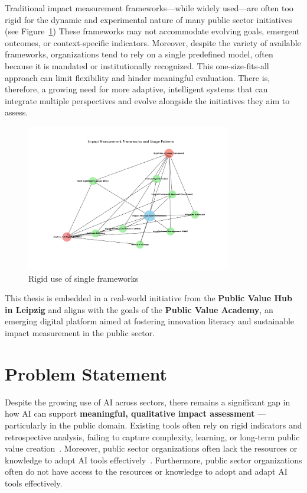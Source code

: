 Traditional impact measurement frameworks—while widely used—are often too rigid for the dynamic and experimental nature of many public sector initiatives (see Figure~\ref{fig:rigid_frameworks})
These frameworks may not accommodate evolving goals, emergent outcomes, or context-specific indicators.
Moreover, despite the variety of available frameworks, organizations tend to rely on a single predefined model, often because it is mandated or institutionally recognized.
This one-size-fits-all approach can limit flexibility and hinder meaningful evaluation.
There is, therefore, a growing need for more adaptive, intelligent systems that can integrate multiple perspectives and evolve alongside the initiatives they aim to assess.

\begin{figure}[H]
  \centering
  \includegraphics[width=0.8\textwidth]{../fig/rigid_use_frameworks}
  \caption{Rigid use of single frameworks}
  \label{fig:rigid_frameworks}
\end{figure}

This thesis is embedded in a real-world initiative from the \textbf{Public Value Hub in Leipzig} and aligns with the goals of the \textbf{Public Value Academy}, an emerging digital platform aimed at fostering innovation literacy and sustainable impact measurement in the public sector.

\section{Problem Statement}\label{sec:problem-statement}
Despite the growing use of AI across sectors, there remains a significant gap in how AI can support \textbf{meaningful, qualitative impact assessment} — particularly in the public domain.
Existing tools often rely on rigid indicators and retrospective analysis, failing to capture complexity, learning, or long-term public value creation~\parencite{ebrahim2014impact, patton2011developmental}.
Moreover, public sector organizations often lack the resources or knowledge to adopt AI tools effectively~\parencite{mikhaylov2018ai}.
Furthermore, public sector organizations often do not have access to the resources or knowledge to adopt and adapt AI tools effectively.

